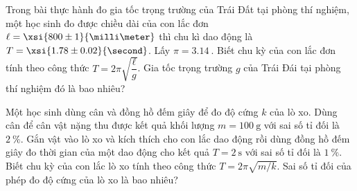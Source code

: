 \begin{vd}
	Trong bài thực hành đo gia tốc trọng trường của Trái Đất tại phòng thí nghiệm, một học sinh đo được chiều dài của con lắc đơn $\ell= \xsi{800\pm 1}{\milli\meter}$ thì chu kì dao động là $T = \xsi{1.78\pm 0.02}{\second}$. Lấy $\pi=\SI{3.14}{}$. Biết chu kỳ của con lắc đơn tính theo công thức $T=2\pi \sqrt{\dfrac{\ell}{g}}$. Gia tốc trọng trường $g$ của Trái Đái tại phòng thí nghiệm đó là bao nhiêu?
\end{vd}

\begin{vd}
	Một học sinh dùng cân và đồng hồ đếm giây để đo độ cứng $k$ của lò xo. Dùng cân để cân vật nặng thu được kết quả khối lượng $m = \SI{100}{\gram}$ với sai số tỉ đối là $\SI{2}{\percent}$. Gắn vật vào lò xo và kích thích cho con lắc dao động rồi dùng đồng hồ đếm giây đo thời gian của một dao động cho kết quả $T = \SI{2}{\second}$ với sai số tỉ đối là $\SI{1}{\percent}$. Biết chu kỳ của con lắc lò xo tính theo công thức $T=2\pi \sqrt{m/k}$. Sai số tỉ đối của phép đo độ cứng của lò xo là bao nhiêu?
\end{vd}
